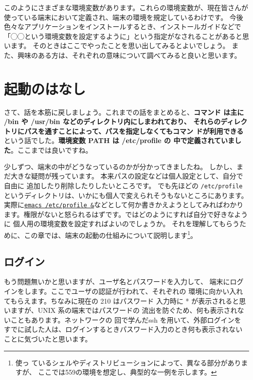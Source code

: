 \documentclass[a4j]{ltjsreport}
\begin{document}
    このようにさまざまな環境変数があります。これらの環境変数が、現在皆さんが
    使っている端末において定義され、端末の環境を規定しているわけです。
    今後色々なアプリケーションをインストールするとき、インストールガイドなどで
    「◯◯という環境変数を設定するように」という指定がなされることがあると思います。
    そのときはここでやったことを思い出してみるとよいでしょう。
    また、興味のある方は、それぞれの意味について調べてみると良いと思います。



    \section{起動のはなし}
    さて、話を本筋に戻しましょう。これまでの話をまとめると、\textbf{コマンド
    は主に /bin や /usr/bin などのディレクトリ内にしまわれており、
    それらのディレクトリにパスを通すことによって、パスを指定しなくてもコマン
    ドが利用できる}という話でした。\textbf{環境変数 PATH は /etc/profile の
    中で定義されていました}。ここまでは良いですね。

    少しずつ、端末の中がどうなっているのかが分かってきましたね。
    しかし、まだ大きな疑問が残っています。
    本来パスの設定などは個人設定として、自分で自由に
    追加したり削除したりしたいところです。
    でも先ほどの
    \verb+/etc/profile+　というディレクトリは、いかにも個人で変えられそうもないところにあります。
    実際に\underline{\texttt{emacs /etc/profile \&}}などとして何か書きかえようとしてみればわかり
    ます。権限がないと怒られるはずです。ではどのようにすれば自分で好きなように
    個人用の環境変数を設定すればよいのでしょうか。
    それを理解してもらうために、この章では、端末の起動の仕組みについて説明します\footnote{使っ
    ているシェルやディストリビューションによって、異なる部分がありますが、
    ここでは559の環境を想定し、典型的な一例を示します。}。

    \subsection{ログイン}
    もう問題無いかと思いますが、ユーザ名とパスワードを入力して、
    端末にログインをします。ここでユーザの認証が行われて、それぞれの
    環境に向かい入れてもらえます。ちなみに現在の 210 はパスワード
    入力時に * が表示されると思いますが、UNIX 系の端末ではパスワードの
    流出を防ぐため、何も表示されないこともあります。ネットワークの
    回で学んだssh を用いて、外部ログインを
    すでに試した人は、ログインするときパスワード入力のとき何も表示されないことに気づいたと思います。
\end{document}
